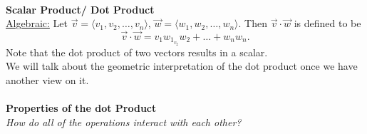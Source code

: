 \documentclass{report}
\begin{document}
\\
\textbf{Scalar Product/ Dot Product} \\
\underline{Algebraic:}  Let $\vec{v} = \langle v_1,v_2,\ldots,v_n  \rangle $, $\vec{w} = \langle w_1,w_2,\ldots, w_n  \rangle $. Then $\vec{v} \cdot \vec{w} $ is defined to be 
\[
\vec{v}  \cdot  \vec{w} = v_1w_1_ v_2w_2 + \ldots + w_nw_n
.\] Note that the dot product of two vectors results in a scalar.\\
We will talk about the geometric interpretation of the dot product once we have another view on it.\\
\\
\textbf{Properties of the dot Product} \\
\textit{How do all of the operations interact with each other?} \\
\end{document}
